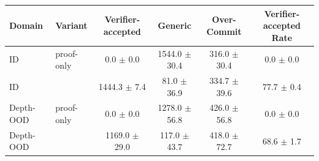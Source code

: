 \begin{tabular}{llcccc}
\toprule
Domain & Variant & Verifier-accepted & Generic & Over-Commit & Verifier-accepted Rate \\
\midrule
ID & proof-only & 0.0 $\pm$ 0.0 & 1544.0 $\pm$ 30.4 & 316.0 $\pm$ 30.4 & 0.0 $\pm$ 0.0 \\
ID & \model{} & 1444.3 $\pm$ 7.4 & 81.0 $\pm$ 36.9 & 334.7 $\pm$ 39.6 & 77.7 $\pm$ 0.4 \\
\midrule
Depth-OOD & proof-only & 0.0 $\pm$ 0.0 & 1278.0 $\pm$ 56.8 & 426.0 $\pm$ 56.8 & 0.0 $\pm$ 0.0 \\
Depth-OOD & \model{} & 1169.0 $\pm$ 29.0 & 117.0 $\pm$ 43.7 & 418.0 $\pm$ 72.7 & 68.6 $\pm$ 1.7 \\
\bottomrule
\end{tabular}